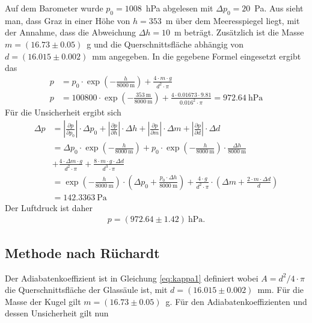 \documentclass{article}
\begin{document}
Auf dem Barometer wurde $p_0=1008$~hPa abgelesen mit $\Delta p_0=20$~Pa. Aus \cite{graz} sieht man, dass Graz in einer Höhe von $h=353$~m über dem Meeresspiegel liegt, mit der Annahme, dass die Abweichung $\Delta h=10$~m beträgt. Zusätzlich ist die Masse $m=(16.73 \pm 0.05)$~g und die Querschnittsfläche abhängig von $d=(16.015 \pm 0.002)$~mm angegeben. In die gegebene Formel eingesetzt ergibt das
\begin{align}
p &= p_0 \cdot \exp\left(-\frac{h}{8000~\text{m}}\right) + \frac{4\cdot m\cdot g}{d^2\cdot \pi} \\
p &= 100800 \cdot \exp\left(-\frac{353~\text{m}}{8000~\text{m}}\right) + \frac{4\cdot 0.01673\cdot 9.81}{0.016^2\cdot \pi} = 972.64~\text{hPa}
\end{align}
Für die Unsicherheit ergibt sich
\begin{align}
\Delta p &= \left| \frac{\partial p}{\partial p_0} \right| \cdot \Delta p_0 + \left| \frac{\partial p}{\partial h} \right| \cdot \Delta h+\left| \frac{\partial p}{\partial m} \right| \cdot \Delta m + \left| \frac{\partial p}{\partial d} \right| \cdot \Delta d  \\
&= \Delta p_0 \cdot \exp\left(-\frac{h}{8000~\text{m}}\right) +p_0\cdot\exp\left(-\frac{h}{8000~\text{m}}\right)\cdot \frac{\Delta h}{8000~\text{m}}
 \\
\nonumber &+ \frac{4\cdot \Delta m\cdot g}{d^2\cdot \pi} + \frac{8\cdot m\cdot g \cdot \Delta d}{d^3\cdot \pi} \\
&= \exp\left(-\frac{h}{8000~\text{m}}\right)\cdot \left( \Delta p_0 + \frac{p_0\cdot \Delta h}{8000~\text{m}}\right) + \frac{4\cdot g}{d^2\cdot \pi}\cdot \left(\Delta m + \frac{2\cdot m\cdot \Delta d}{d} \right) \\
&= 142.3363~\text{Pa}
\end{align}
Der Luftdruck ist daher
\begin{align}
p = (972.64 \pm 1.42)~\text{hPa}.
\end{align}
\subsection{Methode nach Rüchardt}


Der Adiabatenkoeffizient ist in Gleichung \eqref{eq:kappa1} definiert wobei $A=d^2/4\cdot \pi$ die Querschnittsfläche der Glassäule ist, mit $d=(16.015 \pm 0.002)$~mm. Für die Masse der Kugel gilt $m=(16.73 \pm 0.05)$~g. Für den Adiabatenkoeffizienten und dessen Unsicherheit gilt nun
\end{document}
